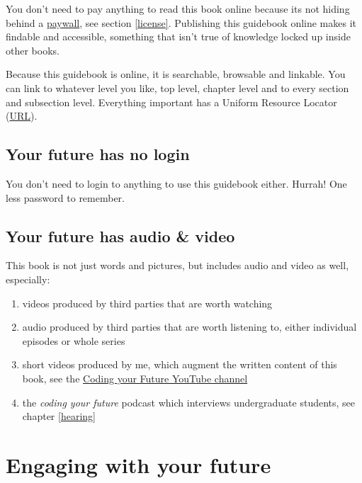 \documentclass[
]{book}
\providecommand{\tightlist}{%
  \setlength{\itemsep}{0pt}\setlength{\parskip}{0pt}}
\begin{document}
You don't need to pay anything to read this book online because its not hiding behind a \href{https://en.wikipedia.org/wiki/Paywall}{paywall}, see section \ref{license}. Publishing this guidebook online makes it findable and accessible, something that isn't true of knowledge locked up inside other books.

Because this guidebook is online, it is searchable, browsable and linkable. You can link to whatever level you like, top level, chapter level and to every section and subsection level. Everything important has a Uniform Resource Locator (\href{https://en.wikipedia.org/wiki/URL}{URL}).

\hypertarget{nologin}{%
\subsection{Your future has no login}\label{nologin}}

You don't need to login to anything to use this guidebook either. Hurrah! One less password to remember.

\hypertarget{av}{%
\subsection{Your future has audio \& video}\label{av}}

This book is not just words and pictures, but includes audio and video as well, especially:

\begin{enumerate}
\def\labelenumi{\arabic{enumi}.}
\tightlist
\item
  videos produced by third parties that are worth watching
\item
  audio produced by third parties that are worth listening to, either individual episodes or whole series
\item
  short videos produced by me, which augment the written content of this book, see the \href{https://www.youtube.com/channel/UCLBv_u8JmyUPqmRALIjVnLg}{Coding your Future YouTube channel}
\item
  the \emph{coding your future} podcast which interviews undergraduate students, see chapter \ref{hearing}
\end{enumerate}

\hypertarget{engage}{%
\section{Engaging with your future}\label{engage}}
\end{document}
